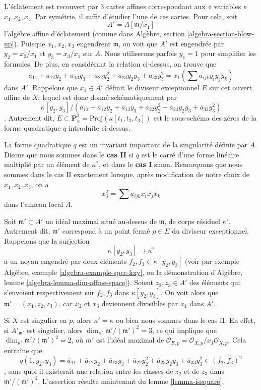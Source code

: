 \medskip\noindent L'éclatement est recouvert par $3$ cartes affines correspondant aux « variables » $x_1, x_2, x_3$. Par symétrie, il suffit d'étudier l'une de ces cartes. Pour cela, soit $$
A' = A[\mathfrak m/x_1]
$$ l'algèbre affine d'éclatement (comme dans Algèbre, section \ref{algebra-section-blow-up}). Puisque $x_1, x_2, x_3$ engendrent $\mathfrak m$, on voit que $A'$ est engendrée par $y_2 = x_2/x_1$ et $y_3 = x_3/x_1$ sur $A$. Nous utiliserons parfois $y_1 = 1$ pour simplifier les formules. De plus, en considérant la relation ci-dessus, on trouve que $$
a_{11} + a_{12} y_2 + a_{13} y_3 + a_{22} y_2^2 +
a_{23} y_2y_3 + a_{33} y_3^2 =
x_1 (\sum a_{ijk} y_iy_jy_k)
$$ dans $A'$. Rappelons que $x_1 \in A'$ définit le diviseur exceptionnel $E$ sur cet ouvert affine de $X$, lequel est donc donné schématiquement par $$
\kappa[y_2, y_3]/
(\overline{a}_{11} + \overline{a}_{12} y_2 + \overline{a}_{13} y_3 +
\overline{a}_{22} y_2^2 + \overline{a}_{23} y_2y_3 + \overline{a}_{33} y_3^2)
$$. Autrement dit, $E \subset \mathbf{P}^2_\kappa = \text{Proj}(\kappa[t_1, t_2, t_3])$ est le sous-schéma des zéros de la forme quadratique $q$ introduite ci-dessus.

\medskip\noindent La forme quadratique $q$ est un invariant important de la singularité définie par $A$. Disons que nous sommes dans le {\bf cas II} si $q$ est le carré d'une forme linéaire multiplié par un élément de $\kappa^*$, et dans le {\bf cas I} sinon. Remarquons que nous sommes dans le cas II exactement lorsque, après modification de notre choix de $x_1, x_2, x_3$, on a $$
x_3^2 = \sum a_{ijk}x_ix_jx_k
$$ dans l'anneau local $A$.

\medskip\noindent Soit $\mathfrak m' \subset A'$ un idéal maximal situé au-dessus de $\mathfrak m$, de corps résiduel $\kappa'$. Autrement dit, $\mathfrak m'$ correspond à un point fermé $p \in E$ du diviseur exceptionnel. Rappelons que la surjection $$
\kappa[y_2, y_3] \to \kappa'
$$ a un noyau engendré par deux éléments $f_2, f_3 \in \kappa[y_2, y_3]$ (voir par exemple Algèbre, exemple \ref{algebra-example-spec-kxy}, ou la démonstration d'Algèbre, lemme \ref{algebra-lemma-dim-affine-space}). Soient $z_2, z_3 \in A'$ des éléments qui s'envoient respectivement sur $f_2, f_3$ dans $\kappa[y_2, y_3]$. On voit alors que $\mathfrak m' = (x_1, z_2, z_3)$, car $x_2$ et $x_3$ deviennent divisibles par $x_1$ dans $A'$.

\medskip{} Si $X$ est singulier en $p$, alors $\kappa' = \kappa$ ou bien nous sommes dans le cas II. En effet, si $A'_{\mathfrak m'}$ est singulier, alors $\dim_{\kappa'} \mathfrak m'/(\mathfrak m')^2 = 3$, ce qui implique que $\dim_{\kappa'} \overline{\mathfrak m}'/(\overline{\mathfrak m}')^2 = 2$, où $\overline{m}'$ est l'idéal maximal de $\mathcal{O}_{E, p} = \mathcal{O}_{X, p}/x_1\mathcal{O}_{X, p}$. Cela entraîne que $$
q(1, y_2, y_3) =
\overline{a}_{11} + \overline{a}_{12} y_2 + \overline{a}_{13} y_3 +
\overline{a}_{22} y_2^2 + \overline{a}_{23} y_2y_3 + \overline{a}_{33} y_3^2
\in (f_2, f_3)^2
$$, sans quoi il existerait une relation entre les classes de $z_2$ et de $z_3$ dans $\overline{\mathfrak m}'/(\overline{\mathfrak m}')^2$. L'assertion résulte maintenant du lemme \ref{lemma-issquare}.

